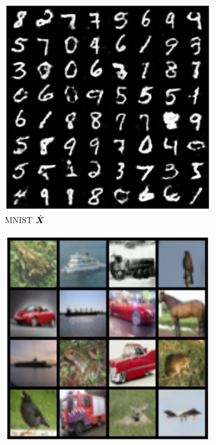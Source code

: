 \documentclass[../../book-main.tex]{subfiles}
\begin{document}
\begin{figure}[t]
\begin{subfigure}[t]{0.20\textwidth}
        \includegraphics[width=\textwidth]{figs_chap6/mnist_recon_x.png}
        \caption{MNIST $\hat{\bm{X}}$}
    \end{subfigure}
    \hfill
    \begin{subfigure}[t]{0.20\textwidth}
        \centering
        \includegraphics[width=\textwidth]{figs_chap6/cifar10_x.png}

\end{subfigure}
\end{figure}
\end{document}
